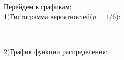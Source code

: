 \documentclass[a4paper,12pt, oneside]{article}
\begin{document}
\vspace{\baselineskip}
Перейдем к графикам:
\vspace{\baselineskip}\\	
1)Гистограмма вероятностей($p = 1/6$):

\begin{minipage}[h]{0.55\linewidth}
\end{minipage}
\\
\vspace{\baselineskip}\\

2)График функции распределения:\\
\begin{minipage}[h]{0.55\linewidth}	
\end{minipage}
\end{document}
